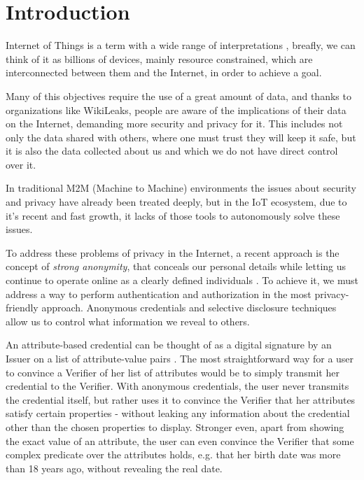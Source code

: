 
\section{Introduction}

Internet of Things is a term with a wide range of interpretations \cite{Atzori20102787}, breafly, we can think of it as billions of devices, mainly resource constrained, which are interconnected between them and the Internet, in order to achieve a goal.

Many of this objectives require the use of a great amount of data, and thanks to organizations like WikiLeaks, people are aware of the implications of their data on the Internet, demanding more security and privacy for it. This includes not only the data shared with others, where one must trust they will keep it safe, but it is also the data collected about us and which we do not have direct control over it.

In traditional M2M (Machine to Machine) environments the issues about security and privacy have already been treated deeply, but in the IoT ecosystem, due to it's recent and fast growth, it lacks of those tools to autonomously solve these issues.

To address these problems of privacy in the Internet, a recent approach is the concept of \textit{strong anonymity}, that conceals our personal details while letting us continue to operate online as a clearly defined individuals \cite{stronganonymity}. To achieve it, we must address a way to perform authentication and authorization in the most privacy-friendly approach. Anonymous credentials and selective disclosure techniques allow us to control what information we reveal to others.

An attribute-based credential can be thought of as a digital signature by an Issuer on a list of attribute-value pairs \cite{introCredIBM}.
The most straightforward way for a user to convince a Verifier of her list of attributes would be to simply transmit her credential to the Verifier.
With anonymous credentials, the user never transmits the credential itself, but rather uses it to convince the Verifier that her attributes satisfy certain properties - without leaking any information about the credential other than the chosen properties to display. 
Stronger even, apart from showing the exact value of an attribute, the user can even convince the
Verifier that some complex predicate over the attributes holds, e.g. that her birth date was more than 18 years ago, without revealing the real date.

